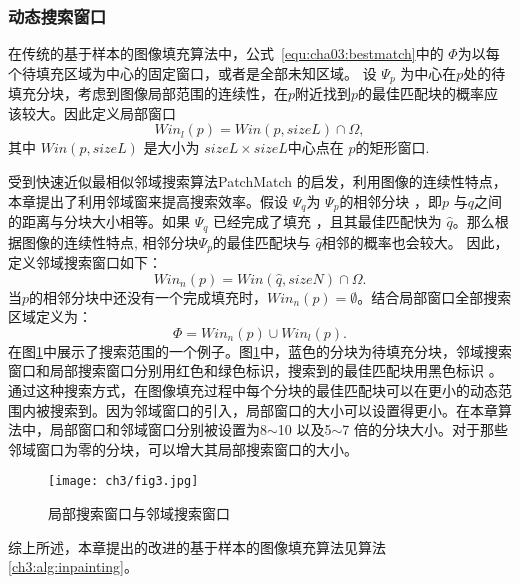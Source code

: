  \subsubsection{动态搜索窗口}
 \label{sec:subsub:dynamicSearch}
 在传统的基于样本的图像填充算法中，公式~\ref{equ:cha03:bestmatch}中的 \(\Phi\)为以每个待填充区域为中心的固定窗口\cite{LeMeur_2011}，或者是全部未知区域。 设 \(\Psi_p\) 为中心在\(p\)处的待填充分块，考虑到图像局部范围的连续性，在\(p\)附近找到\(p\)的最佳匹配块的概率应该较大。因此定义局部窗口
 $$Win_l(p)=Win(p,sizeL)\cap \Omega,$$
 其中 \(Win(p,sizeL)\) 是大小为 \(sizeL\times sizeL\)中心点在 \( p\)的矩形窗口. \par
受到快速近似最相似邻域搜索算法PatchMatch \cite{Barnes:2009}的启发，利用图像的连续性特点，本章提出了利用邻域窗来提高搜索效率。假设 \(\Psi_q\)为 \(\Psi_p\)的相邻分块 ，即\(p\) 与\(q\)之间的距离与分块大小相等。如果 \(\Psi_q\) 已经完成了填充 ，且其最佳匹配快为 \(\hat{q}\)。那么根据图像的连续性特点,  相邻分块\(\Psi_p\)的最佳匹配块与 \(\hat{q}\)相邻的概率也会较大。 因此，定义邻域搜索窗口如下：
 $$Win_n(p)=Win(\hat{q},sizeN)\cap\Omega.$$
 当\(p\)的相邻分块中还没有一个完成填充时，\( Win_n(p)=\emptyset  \)。结合局部窗口全部搜索区域定义为：
 $$\Phi=Win_n(p)\cup Win_l(p).$$
 在图\ref{ch3:fig:3}中展示了搜索范围的一个例子。图\ref{ch3:fig:3}中，蓝色的分块为待填充分块，邻域搜索窗口和局部搜索窗口分别用红色和绿色标识，搜索到的最佳匹配块用黑色标识 。通过这种搜索方式，在图像填充过程中每个分块的最佳匹配块可以在更小的动态范围内被搜索到。因为邻域窗口的引入，局部窗口的大小可以设置得更小。在本章算法中，局部窗口和邻域窗口分别被设置为8\(\sim\)10 以及5\(\sim\)7 倍的分块大小。对于那些邻域窗口为零的分块，可以增大其局部搜索窗口的大小。\par
 \begin{figure}[!htbp]
 	\begin{center}
 			\texttt{[image: ch3/fig3.jpg]}
 	\end{center}
     \caption{局部搜索窗口与邻域搜索窗口}
 	\label{ch3:fig:3}
 \end{figure}
 综上所述，本章提出的改进的基于样本的图像填充算法见算法\ref{ch3:alg:inpainting}。
 \renewcommand{\algorithmcfname}{算法}

